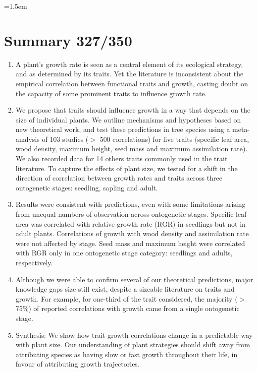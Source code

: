\documentclass[a4paper,11pt]{article}
\date{}
\begin{document}
\mstitlepage
\noindent
\parindent=1.5em
\addtolength{\parskip}{.3em}
\doublespacing
\linenumbers
\section{Summary 327/350}\label{abstract}
\begin{enumerate}
\def\labelenumi{\arabic{enumi}.}
\itemsep1pt\parskip0pt
\item A plant's growth rate is seen as a central element of its ecological strategy, and as determined by its traits. Yet the literature is inconsistent about the empirical correlation between functional traits and growth, casting doubt on the capacity of some prominent traits to influence growth rate.

\item We propose that traits should influence growth in a way that depends on the size of individual plants. We outline mechanisms and hypotheses based on new theoretical work, and test these predictions in tree species using a meta-analysis of 103 studies ($>$ 500 correlations) for five traits (specific leaf area, wood density, maximum height, seed mass and maximum assimilation rate). We also recorded data for 14 others traits commonly used in the trait literature. To capture the effects of plant size, we tested for a shift in the direction of correlation between growth rates and traits across three ontogenetic stages: seedling, sapling and adult.

\item Results were consistent with predictions, even with some limitations arising from unequal numbers of observation across ontogenetic stages. Specific leaf area was correlated with relative growth rate (RGR) in seedlings but not in adult plants. Correlations of growth with wood density and assimilation rate were not affected by stage. Seed mass and maximum height were correlated with RGR only in one ontogenetic stage category: seedlings and adults, respectively.

\item Although we were able to confirm several of our theoretical predictions, major knowledge gaps size still exist, despite a sizeable literature on traits and growth. For example, for one-third of the trait considered, the majority ($>$ 75\%) of reported correlations with growth came from a single ontogenetic stage.

\item Synthesis: We show how trait-growth correlations change in a predictable way with plant size. Our understanding of plant strategies should shift away from attributing species as having slow or fast growth throughout their life, in favour of attributing growth trajectories.
\end{enumerate}
\end{document}
